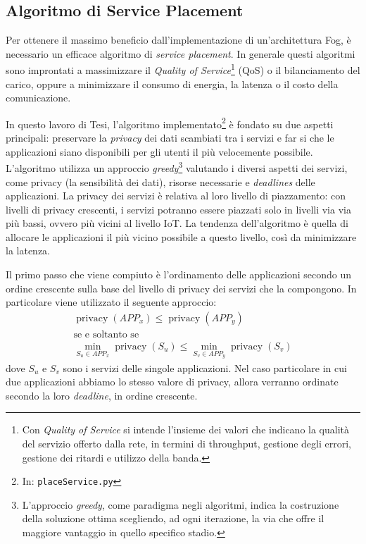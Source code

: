 \subsection{Algoritmo di Service Placement}

Per ottenere il massimo beneficio dall'implementazione di un'architettura Fog, è necessario un efficace algoritmo di \textit{service placement}. In generale questi algoritmi sono improntati a massimizzare il \textit{Quality of Service}\footnote{Con \textit{Quality of Service} si intende l'insieme dei valori che indicano la qualità del servizio offerto dalla rete, in termini di throughput, gestione degli errori, gestione dei ritardi e utilizzo della banda.} (QoS) o il bilanciamento del carico, oppure a minimizzare il consumo di energia, la latenza o il costo della comunicazione.

In questo lavoro di Tesi, l'algoritmo implementato\footnote{In: \texttt{placeService.py}} è fondato su due aspetti principali: preservare la \textit{privacy} dei dati scambiati tra i servizi e far si che le applicazioni siano disponibili per gli utenti il più velocemente possibile. L'algoritmo utilizza un approccio \textit{greedy}\footnote{L'approccio \textit{greedy}, come paradigma negli algoritmi, indica la costruzione della soluzione ottima scegliendo, ad ogni iterazione, la via che offre il maggiore vantaggio in quello specifico stadio. } valutando i diversi aspetti dei servizi, come privacy (la sensibilità dei dati), risorse necessarie e \textit{deadlines} delle applicazioni. La privacy dei servizi è relativa al loro livello di piazzamento: con livelli di privacy crescenti, i servizi potranno essere piazzati solo in livelli via via più bassi, ovvero più vicini al livello IoT. La tendenza dell'algoritmo è quella di allocare le applicazioni il più vicino possibile a questo livello, così da minimizzare la latenza.

Il primo passo che viene compiuto è l'ordinamento delle applicazioni secondo un ordine crescente sulla base del livello di privacy dei servizi che la compongono. In particolare viene utilizzato il seguente approccio:
\begin{equation*}  
	\begin{array}{c}

\displaystyle \operatorname{privacy}(APP_x) \leq \operatorname{privacy}(APP_y)\\
\text{se e soltanto se}\\
\displaystyle \min_{S_u \in APP_x} \operatorname{privacy}(S_u) \leq \min_{S_v \in APP_y} \operatorname{privacy}(S_v)
 	\end{array}
\end{equation*}
dove $S_u$ e $S_v$ sono i servizi delle singole applicazioni. Nel caso particolare in cui due applicazioni abbiamo lo stesso valore di privacy, allora verranno ordinate secondo la loro \textit{deadline}, in ordine crescente.

